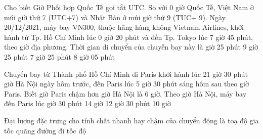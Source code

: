 \begin{ex}
		\loigiai{
		}
\end{ex}

\begin{ex}
	Cho biết Giờ Phối hợp Quốc Tế gọi tắt UTC. So với 0 giờ Quốc Tế, Việt Nam ở múi giờ thứ 7 (UTC+7) và Nhật Bản ở múi giờ thứ 9 (TUC+ 9). Ngày 20/12/2021, máy bay VN300, thuộc hãng hàng không Vietnam Airlines, khởi hành từ Tp. Hồ Chí Minh lúc 0 giờ 20 phút và đến Tp. Tokyo lúc 7 giờ 45 phút, theo giờ địa phương. Thời gian di chuyển của chuyến bay này là
	\choice
	{ giờ 25 phút}
	{9 giờ 25 phút}
	{7 giờ 25 phút}
	{8 giờ 05 phút}
	\loigiai{
	}
\end{ex}

\begin{ex}
	Chuyến bay từ Thành phố Hồ Chí Minh đi Paris khởi hành lúc 21 giờ 30 phút giờ Hà Nội ngày hôm trước, đến Paris lúc 5 giờ 30 phút sáng hôm sau theo giờ Paris. Biết giờ Paris chậm hơn giờ Hà Nội là 6 giờ. Theo giờ Hà Nội, máy bay đến Paris lúc
	\choice
	{ giờ 30 phút}
	{14 giờ}
	{12 giờ 30 phút}
	{10 giờ}
	\loigiai{
	}
\end{ex}
\begin{ex}
	Đại lượng đặc trưng cho tính chất nhanh hay chậm của chuyển động là 
	\choice
	{toạ độ}
	{gia tốc}
	{quãng đường đi}
	{\True tốc độ}
	\loigiai{
	}
\end{ex}

